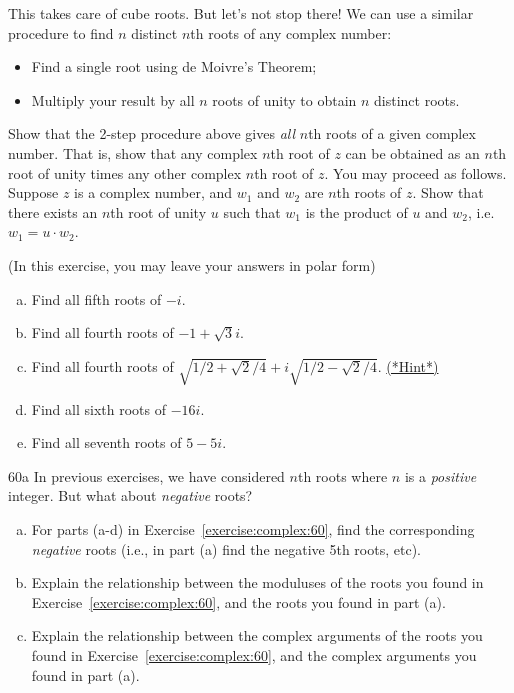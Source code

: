 This takes care of cube roots. But let's not stop there! We can use a similar procedure to find  $n$ distinct $n$th roots of any complex number:
\begin{itemize}
\item Find a single root using de Moivre's Theorem;
\item Multiply your result by all $n$ roots of unity to obtain $n$ distinct roots.
\end{itemize}

\begin{exercise}{59}
Show that the 2-step procedure above gives \emph{all} $n$th roots of a given complex number. That is, show that any complex $n$th root of $z$ can be obtained as an $n$th root of unity times any other complex $n$th root of $z$. You may proceed as follows. Suppose $z$ is a complex number, and $w_1$ and $w_2$ are $n$th roots of $z$. Show that there exists an $n$th root of unity $u$ such that $w_1$ is the product of $u$ and $w_2$, i.e. $w_1=u \cdot w_2$. 
\end{exercise}

\begin{exercise}{60}
(In this exercise, you may leave your answers in polar form)
\begin{enumerate}[(a)]
\item
Find all fifth roots of $-i$.
\item
Find all fourth roots of $-1 + \sqrt{3}i$.
\item
Find all fourth roots of $ \sqrt{1/2 + \sqrt{2}/4} + i\sqrt{1/2 - \sqrt{2}/4}$. 
\hyperref[sec:complex:hints]{(*Hint*)}
\item
Find all sixth roots of $-16i$.
\item
Find all seventh roots of $5 - 5i$.
\end{enumerate}
\end{exercise}

\begin{exercise}{60a}
In previous exercises, we have considered $n$th roots where $n$ is a \emph{positive} integer. But what about \emph{negative} roots?
\begin{enumerate}[(a)]
\item
For parts (a-d) in Exercise~\ref{exercise:complex:60}, find the corresponding \emph{negative} roots (i.e., in part (a) find the negative 5th roots, etc).
\item
Explain the relationship between the moduluses of the roots you found in Exercise~\ref{exercise:complex:60}, and the roots you found in part (a).
\item
Explain the relationship between the complex arguments of the roots you found in Exercise~\ref{exercise:complex:60}, and the complex arguments you found in part (a).
\end{enumerate}
\end{exercise}

